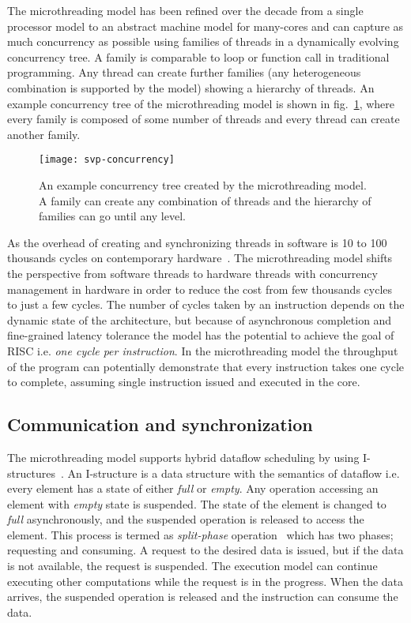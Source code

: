\documentclass{article}
\begin{document}
The microthreading model has been refined over the decade from a single
processor model to an abstract machine model for many-cores and can capture as
much concurrency as possible using families of threads in a dynamically
evolving concurrency tree. A family is comparable to loop or function call in
traditional programming. Any thread can create further families (any
heterogeneous combination is supported by the model) showing a hierarchy of
threads. An example concurrency tree of the microthreading model is shown
in fig.~\ref{fig:svp_concurrency}, where every family is composed of some number of
threads and every thread can create another family.

\begin{figure}
\begin{centering}
    \texttt{[image: svp-concurrency]}
    \caption{\label{fig:svp_concurrency}An example concurrency tree created by the microthreading model. A family
    can create any combination of threads and the hierarchy of families can go
    until any level.}
\end{centering}
\end{figure}

As the overhead of creating and synchronizing threads in software is 10 to 100
thousands cycles on contemporary hardware~\cite{T3-2011}. The microthreading
model shifts the perspective from software threads to hardware threads with
concurrency management in hardware in order to reduce the cost from few
thousands cycles to just a few cycles.  The number of cycles taken by an
instruction depends on the dynamic state of the architecture, but because of
asynchronous completion and fine-grained latency tolerance the model has the
potential to achieve the goal of RISC i.e. \emph{one cycle per instruction}. In
the microthreading model the throughput of the program can potentially
demonstrate that every instruction takes one cycle to complete, assuming
single instruction issued and executed in the core.

\subsection{Communication and synchronization}
\label{sn:communitation_synchronization}

The microthreading model supports hybrid dataflow scheduling by using
I-structures~\cite{Arvind:1989:IDS:69558.69562}. An I-structure is a data
structure with the semantics of dataflow i.e. every element has a state of
either \emph{full} or \emph{empty}. Any operation accessing an element with
\emph{empty} state is suspended. The state of the element is changed to
\emph{full} asynchronously, and the suspended operation is released to access
the element. This process is termed as \emph{split-phase}
operation~\cite{Lin98thedesign} which has two phases; requesting and consuming.
A request to the desired data is issued, but if the data is not available, the
request is suspended. The execution model can continue executing other
computations while the request is in the progress. When the data arrives, the
suspended operation is released and the instruction can consume the data. 
\end{document}
